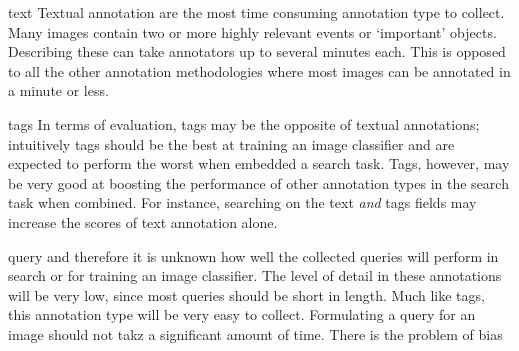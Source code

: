 text
Textual annotation are the most time consuming annotation type to collect. Many images contain two or more highly relevant events or `important' objects. Describing these can take annotators up to several minutes each. This is opposed to all the other annotation methodologies where most images can be annotated in a minute or less.

tags
In terms of evaluation, tags may be the opposite of textual annotations; intuitively tags should be the best at training an image classifier and are expected to perform the worst when embedded a search task. Tags, however, may be very good at boosting the performance of other annotation types in the search task when combined. For instance, searching on the text \textit{and} tags fields may increase the scores of text annotation alone.

query
and therefore it is unknown how well the collected queries will perform in search or for training an image classifier. The level of detail in these annotations will be very low, since most queries should be short in length.
Much like tags, this annotation type will be very easy to collect. Formulating a query for an image should not takz a significant amount of time. There is the problem of bias 
